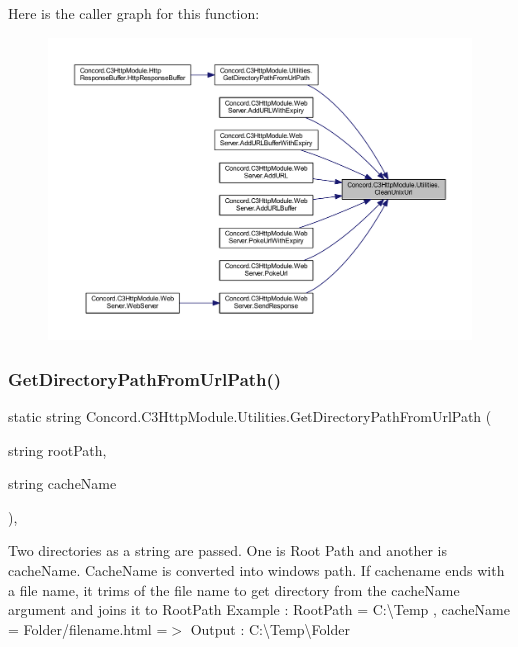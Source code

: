 Here is the caller graph for this function\+:
\nopagebreak
\begin{figure}[H]
\begin{center}
\leavevmode
\includegraphics[width=350pt]{class_concord_1_1_c3_http_module_1_1_utilities_a5c66ffbfd1a9f0723be7b7163ce9f778_icgraph}
\end{center}
\end{figure}
\mbox{\label{class_concord_1_1_c3_http_module_1_1_utilities_a38d22d17b3554cf5064b7b4a9e5dbef0}} 
\subsubsection{\texorpdfstring{GetDirectoryPathFromUrlPath()}{GetDirectoryPathFromUrlPath()}}
{\footnotesize\ttfamily static string Concord.\+C3\+Http\+Module.\+Utilities.\+Get\+Directory\+Path\+From\+Url\+Path (\begin{DoxyParamCaption}\item[{string}]{root\+Path,  }\item[{string}]{cache\+Name }\end{DoxyParamCaption})\hspace{0.3cm}{\ttfamily [inline]}, {\ttfamily [static]}}



Two directories as a string are passed. One is Root Path and another is cache\+Name. Cache\+Name is converted into windows path. If cachename ends with a file name, it trims of the file name to get directory from the cache\+Name argument and joins it to Root\+Path Example \+: Root\+Path = C\+:\textbackslash{}\+Temp , cache\+Name = Folder/filename.\+html =$>$ Output \+: C\+:\textbackslash{}\+Temp\textbackslash{}\+Folder 


